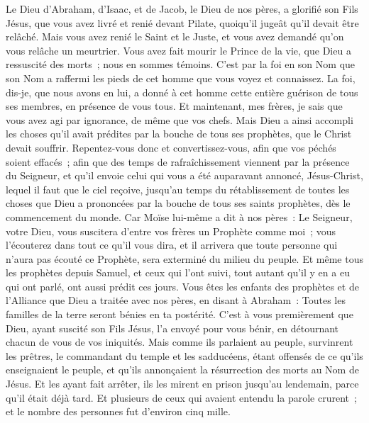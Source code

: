 \begin{multicols}{2}
Le Dieu d'Abraham, d'Isaac, et de Jacob, le Dieu de nos pères, a glorifié son Fils Jésus, que vous avez livré et renié devant Pilate, quoiqu'il jugeât qu'il devait être relâché.
Mais vous avez renié le Saint et le Juste, et vous avez demandé qu'on vous relâche un meurtrier.
Vous avez fait mourir le Prince de la vie, que Dieu a ressuscité des morts~; nous en sommes témoins.
C'est par la foi en son Nom que son Nom a raffermi les pieds de cet homme que vous voyez et connaissez. La foi, dis-je, que nous avons en lui, a donné à cet homme cette entière guérison de tous ses membres, en présence de vous tous.
Et maintenant, mes frères, je sais que vous avez agi par ignorance, de même que vos chefs.
Mais Dieu a ainsi accompli les choses qu'il avait prédites par la bouche de tous ses prophètes, que le Christ devait souffrir.
Repentez-vous donc et convertissez-vous, afin que vos péchés soient effacés~;
afin que des temps de rafraîchissement viennent par la présence du Seigneur, et qu'il envoie celui qui vous a été auparavant annoncé, Jésus-Christ,
lequel il faut que le ciel reçoive, jusqu'au temps du rétablissement de toutes les choses que Dieu a prononcées par la bouche de tous ses saints prophètes, dès le commencement du monde.
Car Moïse lui-même a dit à nos pères~: Le Seigneur, votre Dieu, vous suscitera d'entre vos frères un Prophète comme moi~; vous l'écouterez dans tout ce qu'il vous dira,
et il arrivera que toute personne qui n'aura pas écouté ce Prophète, sera exterminé du milieu du peuple.
Et même tous les prophètes depuis Samuel, et ceux qui l'ont suivi, tout autant qu'il y en a eu qui ont parlé, ont aussi prédit ces jours.
Vous êtes les enfants des prophètes et de l'Alliance que Dieu a traitée avec nos pères, en disant à Abraham~: Toutes les familles de la terre seront bénies en ta postérité.
C'est à vous premièrement que Dieu, ayant suscité son Fils Jésus, l'a envoyé pour vous bénir, en détournant chacun de vous de vos iniquités.
\VerseOne{}Mais comme ils parlaient au peuple, survinrent les prêtres, le commandant du temple et les sadducéens,
étant offensés de ce qu'ils enseignaient le peuple, et qu'ils annonçaient la résurrection des morts au Nom de Jésus.
Et les ayant fait arrêter, ils les mirent en prison jusqu'au lendemain, parce qu'il était déjà tard.
Et plusieurs de ceux qui avaient entendu la parole crurent~; et le nombre des personnes fut d'environ cinq mille.

\end{multicols}
